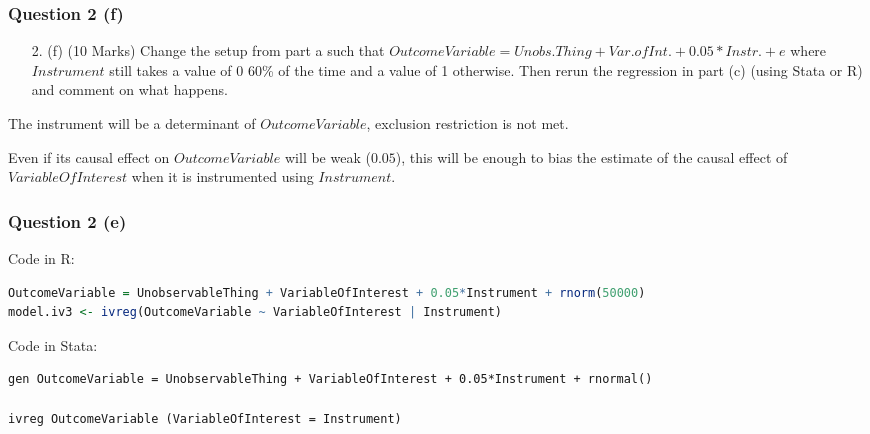 \documentclass[xcolor=table,dvipsnames]{beamer}
\begin{document}
\begin{frame}
\frametitle{Question 2 (f)}
\begin{enumerate}
\item[2.](f) (10 Marks) Change the setup from part a such that $OutcomeVariable = Unobs.Thing + Var.ofInt. + 0.05*Instr. + e$ where $Instrument$ still takes a value of 0 60\% of the time and a value of 1 otherwise. Then rerun the regression in part (c) (using Stata or R) and comment on what happens.
\end{enumerate}\pause

The instrument will be a determinant of $OutcomeVariable$, exclusion restriction is not met. \pause

Even if its causal effect on $OutcomeVariable$ will be weak ($0.05$), this will be enough to bias the estimate of the causal effect of $VariableOfInterest$ when it is instrumented using $Instrument$.
\end{frame}

\begin{frame}[fragile]
\frametitle{Question 2 (e)}
Code in R:
\begin{lstlisting}[language=R]
OutcomeVariable = UnobservableThing + VariableOfInterest + 0.05*Instrument + rnorm(50000)
model.iv3 <- ivreg(OutcomeVariable ~ VariableOfInterest | Instrument)
\end{lstlisting} \pause

Code in Stata:
\begin{lstlisting}
gen OutcomeVariable = UnobservableThing + VariableOfInterest + 0.05*Instrument + rnormal()

ivreg OutcomeVariable (VariableOfInterest = Instrument)
\end{lstlisting}
\end{frame}
\end{document}
